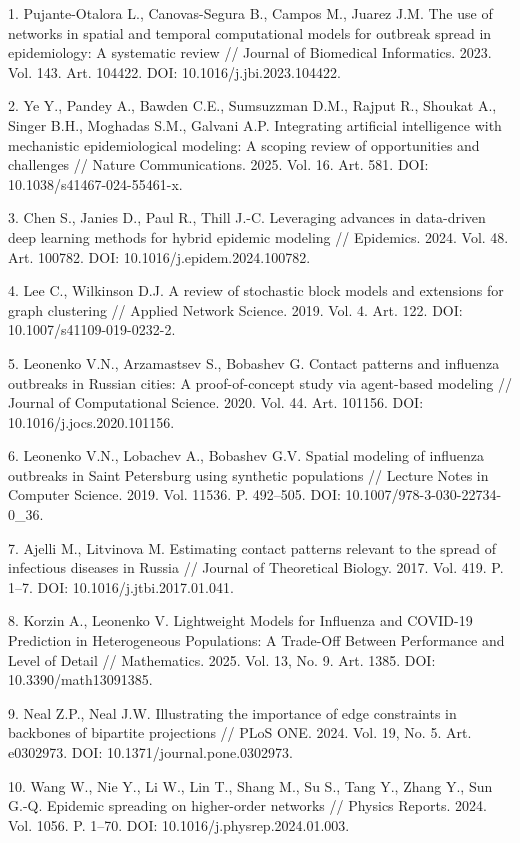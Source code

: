 \documentclass[12pt,a4paper,twocolumn]{article}
\begin{document}
\begin{small}


1. Pujante-Otalora L., Canovas-Segura B., Campos M., Juarez J.M. The use of networks in spatial and temporal computational models for outbreak spread in epidemiology: A systematic review // Journal of Biomedical Informatics. 2023. Vol. 143. Art. 104422. DOI: 10.1016/j.jbi.2023.104422.

2. Ye Y., Pandey A., Bawden C.E., Sumsuzzman D.M., Rajput R., Shoukat A., Singer B.H., Moghadas S.M., Galvani A.P. Integrating artificial intelligence with mechanistic epidemiological modeling: A scoping review of opportunities and challenges // Nature Communications. 2025. Vol. 16. Art. 581. DOI: 10.1038/s41467-024-55461-x.

3. Chen S., Janies D., Paul R., Thill J.-C. Leveraging advances in data-driven deep learning methods for hybrid epidemic modeling // Epidemics. 2024. Vol. 48. Art. 100782. DOI: 10.1016/j.epidem.2024.100782.

4. Lee C., Wilkinson D.J. A review of stochastic block models and extensions for graph clustering // Applied Network Science. 2019. Vol. 4. Art. 122. DOI: 10.1007/s41109-019-0232-2.

5. Leonenko V.N., Arzamastsev S., Bobashev G. Contact patterns and influenza outbreaks in Russian cities: A proof-of-concept study via agent-based modeling // Journal of Computational Science. 2020. Vol. 44. Art. 101156. DOI: 10.1016/j.jocs.2020.101156.

6. Leonenko V.N., Lobachev A., Bobashev G.V. Spatial modeling of influenza outbreaks in Saint Petersburg using synthetic populations // Lecture Notes in Computer Science. 2019. Vol. 11536. P. 492–505. DOI: 10.1007/978-3-030-22734-0\_36.

7. Ajelli M., Litvinova M. Estimating contact patterns relevant to the spread of infectious diseases in Russia // Journal of Theoretical Biology. 2017. Vol. 419. P. 1–7. DOI: 10.1016/j.jtbi.2017.01.041.

8. Korzin A., Leonenko V. Lightweight Models for Influenza and COVID-19 Prediction in Heterogeneous Populations: A Trade-Off Between Performance and Level of Detail // Mathematics. 2025. Vol. 13, No. 9. Art. 1385. DOI: 10.3390/math13091385.

9. Neal Z.P., Neal J.W. Illustrating the importance of edge constraints in backbones of bipartite projections // PLoS ONE. 2024. Vol. 19, No. 5. Art. e0302973. DOI: 10.1371/journal.pone.0302973.

10. Wang W., Nie Y., Li W., Lin T., Shang M., Su S., Tang Y., Zhang Y., Sun G.-Q. Epidemic spreading on higher-order networks // Physics Reports. 2024. Vol. 1056. P. 1–70. DOI: 10.1016/j.physrep.2024.01.003.


\end{small}
\end{document}
